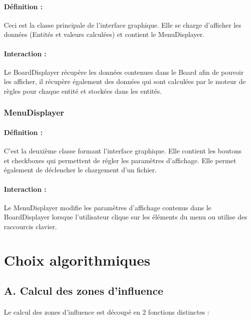 \documentclass[12pt]{article}
\begin{document}
				\paragraph{Définition :}
				Ceci est la classe principale de l'interface graphique. Elle se charge d'afficher les données (Entités et valeurs calculées)
				et contient le MenuDisplayer.
				\paragraph{Interaction :}
				Le BoardDisplayer récupère les données contenues dans le Board afin de pouvoir les afficher, il récupère également des données qui sont calculées
				par le moteur de règles pour chaque entité et stockées dans les entités.

			\subsubsection{MenuDisplayer}

				\paragraph{Définition :}
				C'est la deuxième classe formant l'interface graphique. Elle contient les boutons et checkboxes qui permettent
				de régler les paramètres d'affichage. Elle permet également de déclencher le chargement d'un fichier.
				\paragraph{Interaction :}
				Le MenuDisplayer modifie les paramètres d'affichage contenus dans le BoardDisplayer lorsque l'utilisateur clique
				sur les éléments du menu ou utilise des raccourcis clavier.


		\clearpage
		
	\section{Choix algorithmiques}    

		\subsection{A. Calcul des zones d'influence}
		
		\paragraph{}
		Le calcul des zones d'influence est découpé en 2 fonctions distinctes :
		
\end{document}
